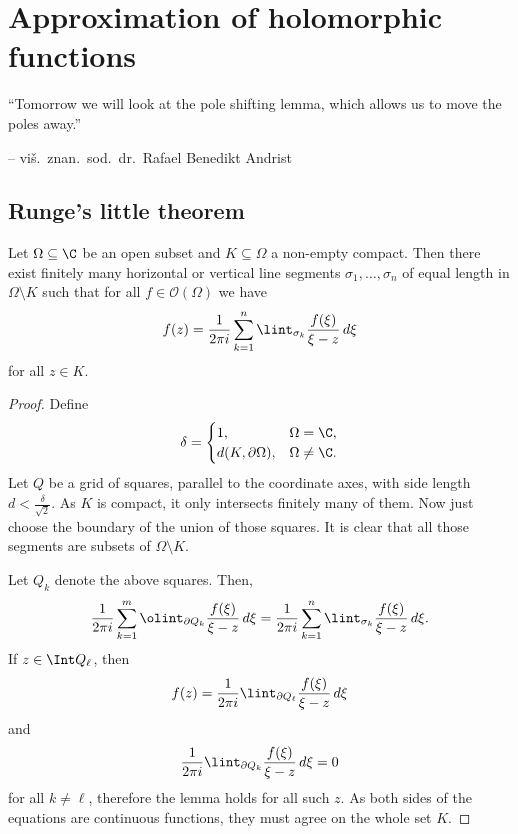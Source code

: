 \section{Approximation of holomorphic functions}

\epigraph{``Tomorrow we will look at the pole shifting lemma, which
allows us to move the poles away.''}
{-- viš.~znan.~sod.~dr.~Rafael Benedikt Andrist}

\subsection{Runge's little theorem}


\begin{lema}\label{app:lm:seg}
Let $\Omega \subseteq \C$ be an open subset and
$K \subseteq \Omega$ a non-empty compact. Then there exist finitely
many horizontal or vertical line segments
$\sigma_1, \dots, \sigma_n$ of equal length in
$\Omega \setminus K$ such that for all $f \in \mathcal{O}(\Omega)$
we have
\[
f(z) = \frac{1}{2 \pi i} \sum_{k=1}^n
\lint_{\sigma_k} \frac{f(\xi)}{\xi - z}\,d\xi
\]
for all $z \in K$.
\end{lema}

\begin{proof}
Define
\[
\delta =
\begin{cases}
          1,           & \Omega = \C,   \\
d(K, \partial \Omega), & \Omega \ne \C.
\end{cases}
\]
Let $Q$ be a grid of squares, parallel to the coordinate axes, with
side length $d < \frac{\delta}{\sqrt{2}}$. As $K$ is compact, it
only intersects finitely many of them. Now just choose the boundary
of the union of those squares. It is clear that all those segments
are subsets of $\Omega \setminus K$.

Let $Q_k$ denote the above squares. Then,
\[
\frac{1}{2 \pi i} \sum_{k=1}^m \olint_{\partial Q_k}
\frac{f(\xi)}{\xi - z}\,d\xi =
\frac{1}{2 \pi i} \sum_{k=1}^n \lint_{\sigma_k}
\frac{f(\xi)}{\xi - z}\,d\xi.
\]
If $z \in \Int Q_\ell$, then
\[
f(z) =
\frac{1}{2 \pi i} \lint_{\partial Q_\ell}
\frac{f(\xi)}{\xi - z}\,d\xi
\]
and
\[
\frac{1}{2 \pi i} \lint_{\partial Q_k}
\frac{f(\xi)}{\xi - z}\,d\xi = 0
\]
for all $k \ne \ell$, therefore the lemma holds for all such $z$.
As both sides of the equations are continuous functions, they must
agree on the whole set $K$.
\end{proof}

